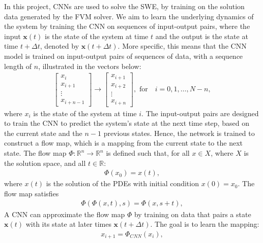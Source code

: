 In this project, CNNs are used to solve the SWE, by training on the solution data generated by the FVM solver.
We aim to learn the underlying dynamics of the system by training the CNN on sequences of input-output pairs, where the input $\mathbf{x}(t)$ is the state of the system at time $t$ and the output is the state at time $t + \Delta t$, denoted by $\mathbf{x}(t + \Delta t)$.
More specific, this means that the CNN model is trained on input-output pairs of sequences of data, with a sequence length of $n$, illustrated in the vectors below:
\begin{align*}
    \begin{bmatrix}
        x_i \\ x_{i+1} \\ \vdots \\ x_{i+n-1}
    \end{bmatrix}
    \to
    \begin{bmatrix}
        x_{i+1} \\ x_{i+2} \\ \vdots \\ x_{i+n}
    \end{bmatrix},
    \text{ for} \quad i = 0, 1, \ldots, N-n,
\end{align*}
where $x_i$ is the state of the system at time $i$.
The input-output pairs are designed to train the CNN to predict the system's state at the next time step, based on the current state and the $n-1$ previous states.
Hence, the network is trained to construct a flow map, which is a mapping from the current state to the next state.
The flow map $\Phi: \mathbb{R}^n \rightarrow \mathbb{R}^n$ is defined such that, for all $x \in X$, where $X$ is the solution space, and all $t \in \mathbb{R}$:
\begin{align*}
    \Phi(x_0) =  x(t),
\end{align*}
where $x(t)$ is the solution of the PDEs with initial condition $x(0) = x_0$.
The flow map satisfies
\begin{align*}
    \Phi(\Phi (x, t), s) = \Phi(x, s + t),
\end{align*}
A CNN can approximate the flow map $\Phi$ by training on data that pairs a state $\mathbf{x}(t)$ with its state at later times $\mathbf{x}(t + \Delta t)$.
The goal is to learn the mapping:
\begin{align*}
    x_{i+1} = \Phi_{CNN} (x_i), 
\end{align*}
